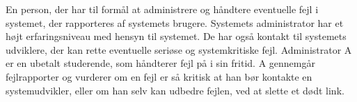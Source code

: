 {En person, der har til formål at administrere og håndtere eventuelle fejl i systemet, der rapporteres af systemets brugere.}
{Systemets administrator har et højt erfaringsniveau med hensyn til systemet. De har også kontakt til systemets udviklere, der kan rette eventuelle seriøse og systemkritiske fejl.}
{Administrator A er en ubetalt studerende, som håndterer fejl på \Foodl{} i sin fritid. A gennemgår fejlrapporter og vurderer om en fejl er så kritisk at han bør kontakte en systemudvikler, eller om han selv kan udbedre fejlen, \fx ved at slette et dødt link.}
{}
